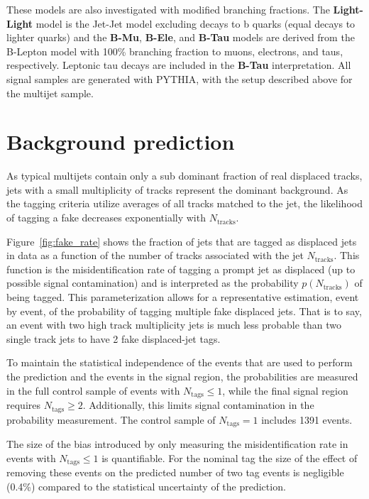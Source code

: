 These models are also investigated with modified
branching fractions.  The \textbf{Light-Light} model is the Jet-Jet
model excluding decays to b quarks (equal decays to lighter quarks)
and the \textbf{B-Mu}, \textbf{B-Ele}, and \textbf{B-Tau} models are
derived from the B-Lepton model with 100\% branching fraction to
muons, electrons, and taus, respectively.  Leptonic tau decays are included 
in the \textbf{B-Tau} interpretation. All signal samples are
generated with PYTHIA, with the setup described above for the
multijet sample. 


\section{Background prediction}
\label{sec:bkg}

As typical multijets contain only a sub dominant fraction of real displaced tracks,
jets with a small multiplicity of tracks represent the dominant background.
As the tagging criteria utilize averages of all tracks matched to the jet, the likelihood of tagging a fake decreases exponentially with $N_\textrm{tracks}$. 

 Figure~\ref{fig:fake_rate} shows the fraction of jets that are tagged as displaced 
jets in data as a function of the number of tracks associated with the jet $N_\textrm{tracks}$.  
 This function is the misidentification rate of tagging a prompt jet as displaced (up to possible
 signal contamination)  and is interpreted as the probability  $p(N_\text{tracks})$ of being tagged. This
 parameterization allows for a representative estimation, event by event, of the probability of
 tagging multiple fake displaced jets. That is to say, an event with two high track multiplicity jets is much
 less probable than two single track jets to have 2 fake displaced-jet tags. 

To maintain the statistical independence of the events
that are used to perform the prediction and the events in the signal
region, the probabilities are measured in the full control sample of events
with $N_{\textrm{tags}}\leq 1$, while the final signal region requires
$N_{\textrm{tags}} \geq 2$. Additionally, this limits signal contamination in the probability measurement.
The control sample of $N_{\textrm{tags}}=1$ includes 1391 events. 

The size of the bias introduced by only measuring the misidentification rate in  
events with $N_\textrm{tags}\leq 1$ is quantifiable. For the nominal tag the size
of the effect of removing these events on the predicted number of
two tag events is negligible (0.4\%)
compared to the statistical uncertainty of the prediction.

